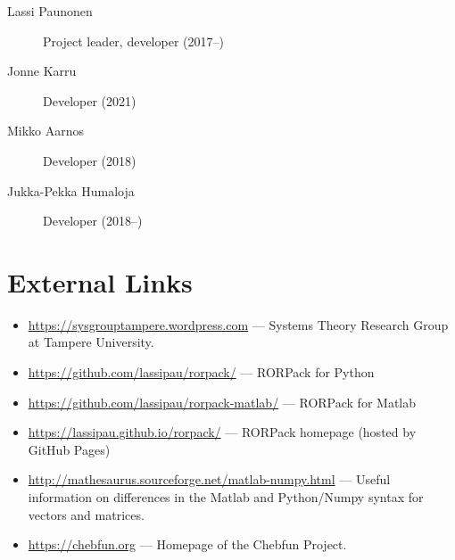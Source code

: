 \documentclass[11pt, a4paper]{amsart}
\theoremstyle{definition}
\numberwithin{equation}{section}
\begin{document}

\begin{description}
  \item[Lassi Paunonen] Project leader, developer (2017--)
  \item[Jonne Karru] Developer (2021)
  \item[Mikko Aarnos] Developer (2018)
  \item[Jukka-Pekka Humaloja] Developer (2018--)
\end{description}



  \appendix

\section{External Links}

\begin{itemize}
  \item \href{https://sysgrouptampere.wordpress.com}{https://sysgrouptampere.wordpress.com} --- Systems Theory Research Group at Tampere University.
  \item  \href{https://github.com/lassipau/rorpack/}{https://github.com/lassipau/rorpack/} --- RORPack for Python
  \item  \href{https://github.com/lassipau/rorpack-matlab/}{https://github.com/lassipau/rorpack-matlab/} --- RORPack for Matlab
\item \href{https://lassipau.github.io/rorpack/}{https://lassipau.github.io/rorpack/}  --- RORPack homepage (hosted by GitHub Pages)
  \item \href{http://mathesaurus.sourceforge.net/matlab-numpy.html}{http://mathesaurus.sourceforge.net/matlab-numpy.html} --- Useful information on differences in the Matlab and Python/Numpy syntax for vectors and matrices.
  \item \href{https://chebfun.org}{https://chebfun.org} --- Homepage of the Chebfun Project.
\end{itemize}
\end{document}
